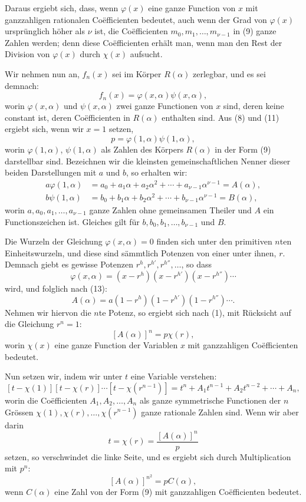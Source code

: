 \documentclass[11pt]{article}
\begin{document}
Daraus ergiebt sich, dass, wenn $\varphi(x)$ eine ganze Function von $x$ mit ganzzahligen rationalen Coëfficienten bedeutet, auch wenn der Grad von $\varphi(x)$ ursprünglich höher als $\nu$ ist, die Coëfficienten $m_0,m_1,\ldots,m_{\nu-1}$ in (9) ganze Zahlen werden; denn diese Coëfficienten erhält man, wenn man den Rest der Division von $\varphi(x)$ durch $\chi(x)$ aufsucht.

Wir nehmen nun an, $f_n(x)$ sei im Körper $R(\alpha)$ zerlegbar, und es sei demnach:
\begin{equation}\tag{11}
f_n(x)=\varphi(x,\alpha)\psi(x,\alpha),
\end{equation}
worin $\varphi(x,\alpha)$ und $\psi(x,\alpha)$ zwei ganze Functionen von $x$ sind, deren keine constant ist, deren Coëfficienten in $R(\alpha)$ enthalten sind. Aus (8) und (11) ergiebt sich, wenn wir $x=1$ setzen,
\begin{equation}\tag{12}
p=\varphi(1,\alpha)\psi(1,\alpha),
\end{equation}
worin $\varphi(1,\alpha)$, $\psi(1,\alpha)$ als Zahlen des Körpers $R(\alpha)$ in der Form (9) darstellbar sind. Bezeichnen wir die kleinsten gemeinschaftlichen Nenner dieser beiden Darstellungen mit $a$ und $b$, so erhalten wir:
\begin{equation}\tag{13}
\begin{aligned}
a\varphi(1,\alpha)&=a_0+a_1\alpha+a_2\alpha^2+\cdots+a_{\nu-1}\alpha^{\nu-1}=A(\alpha),\\
b\psi(1,\alpha)&=b_0+b_1\alpha+b_2\alpha^2+\cdots+b_{\nu-1}\alpha^{\nu-1}=B(\alpha),
\end{aligned}
\end{equation}
worin $a,a_0,a_1,\ldots,a_{\nu-1}$ ganze Zahlen ohne gemeinsamen Theiler und $A$ ein Functionszeichen ist. Gleiches gilt für $b,b_0,b_1,\ldots,b_{\nu-1}$ und $B$.

Die Wurzeln der Gleichung $\varphi(x,\alpha)=0$ finden sich unter den primitiven $n$ten Einheitswurzeln, und diese sind sämmtlich Potenzen von einer unter ihnen, $r$. Demnach giebt es gewisse Potenzen $r^h,r^{h'},r^{h''},\ldots$, so dass
\[
\varphi(x,\alpha)=(x-r^h)(x-r^{h'})(x-r^{h''})\cdots
\]
wird, und folglich nach (13):
\[
A(\alpha)=a(1-r^h)(1-r^{h'})(1-r^{h''})\cdots .
\]
Nehmen wir hiervon die $n$te Potenz, so ergiebt sich nach (1), mit Rücksicht auf die Gleichung $r^n=1$:
\[
[A(\alpha)]^n=p\chi(r),
\]
worin $\chi(x)$ eine ganze Function der Variablen $x$ mit ganzzahligen Coëfficienten bedeutet.

Nun setzen wir, indem wir unter $t$ eine Variable verstehen:
\[
[t-\chi(1)][t-\chi(r)]\cdots[t-\chi(r^{n-1})]
=t^n+A_1t^{n-1}+A_2t^{n-2}+\cdots+A_n,
\]
worin die Coëfficienten $A_1,A_2,\ldots,A_n$ als ganze symmetrische Functionen der $n$ Grössen $\chi(1),\chi(r),\ldots,\chi(r^{n-1})$ ganze rationale Zahlen sind. Wenn wir aber darin
\[
t=\chi(r)=\frac{[A(\alpha)]^n}{p}
\]
setzen, so verschwindet die linke Seite, und es ergiebt sich durch Multiplication mit $p^n$:
\begin{equation}\tag{14}
[A(\alpha)]^{n^2}=pC(\alpha),
\end{equation}
wenn $C(\alpha)$ eine Zahl von der Form (9) mit ganzzahligen Coëfficienten bedeutet.
\end{document}
